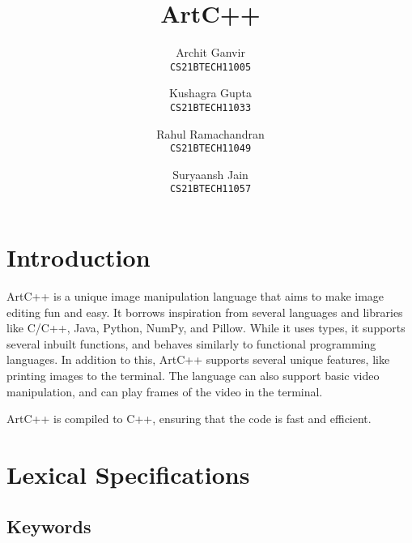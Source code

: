 \documentclass[a4paper, 11pt]{article}
\title{ArtC++}
\author{
  Archit Ganvir \\
  \texttt{CS21BTECH11005}
  \and
  Kushagra Gupta \\
  \texttt{CS21BTECH11033}
  \and
  Rahul Ramachandran\\
  \texttt{CS21BTECH11049}
  \and
  Suryaansh Jain\\
  \texttt{CS21BTECH11057}
}
\date{}
\begin{document}
\maketitle
\tableofcontents

\section{Introduction}

ArtC++ is a unique image manipulation language that aims to make image editing fun and easy. It borrows inspiration from several languages and libraries like C/C++, Java, Python, NumPy, and Pillow. While it uses types, it supports several inbuilt functions, and behaves similarly to functional programming languages. 
In addition to this, ArtC++ supports several unique features, like printing images to the terminal. The language can also support basic video manipulation, and can play frames of the video in the terminal.

ArtC++ is compiled to C++, ensuring that the code is fast and efficient.

\section{Lexical Specifications}
  \subsection{Keywords}
\end{document}
